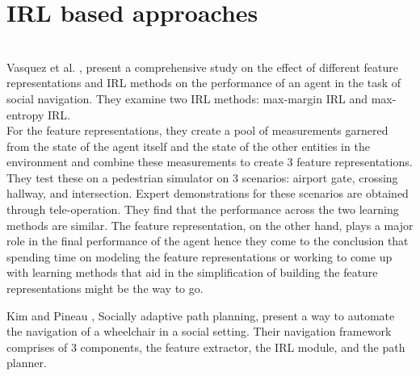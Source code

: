 \section{IRL based approaches}
 \\
Vasquez et al. \cite{vasquez_inverse_2014}, present a comprehensive study on the effect of different feature representations and IRL methods on the performance of an agent in the task of social navigation. They examine two IRL methods: max-margin IRL and max-entropy IRL.  \\
For the feature representations, they create a pool of measurements garnered from the state of the agent itself and the state of the other entities in the environment and combine these measurements to create 3 feature representations. \\
They test these on a  pedestrian simulator on 3 scenarios: airport gate, crossing hallway, and intersection. Expert demonstrations for these scenarios are obtained through tele-operation. They find that the performance across the two learning methods are similar. The feature representation, on the other hand, plays a major role in the final performance of the agent hence they come to the conclusion that spending time on modeling the feature representations or working to come up with learning methods that aid in the simplification of building the feature representations might be the way to go.
\\
\par
Kim and Pineau \cite{kim_socially_2016}, Socially adaptive path planning, present a way to automate the navigation of a wheelchair in a social setting. Their navigation framework comprises of 3 components, the feature extractor, the IRL module, and the path planner.\\
